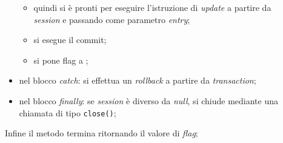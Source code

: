 \begin{description}
\begin{itemize}
\begin{itemize}
			\item quindi si è pronti per eseguire l'istruzione di \textit{update} a partire da \textit{session} e passando come parametro \textit{entry};
			\item si esegue il commit;
			\item si pone flag a ;
		\end{itemize}
		\item nel blocco \textit{catch}: si effettua un \textit{rollback} a partire da \textit{transaction};
		\item nel blocco \textit{finally}: se \textit{session} è diverso da \textit{null}, si chiude mediante una chiamata di tipo \texttt{close()};
	\end{itemize}
	Infine il metodo termina ritornando il valore di \textit{flag};	
	

\end{description}
